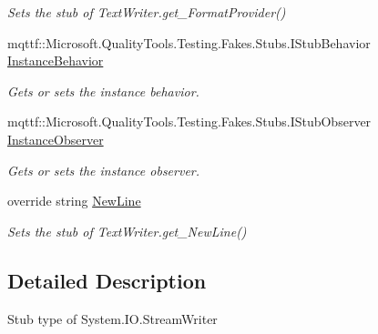 \begin{DoxyCompactItemize}
\begin{DoxyCompactList}\small\item\em Sets the stub of Text\-Writer.\-get\-\_\-\-Format\-Provider()\end{DoxyCompactList}\item 
mqttf\-::\-Microsoft.\-Quality\-Tools.\-Testing.\-Fakes.\-Stubs.\-I\-Stub\-Behavior \hyperlink{class_system_1_1_i_o_1_1_fakes_1_1_stub_stream_writer_ac75f270da6040b457ca503b589400b3b}{Instance\-Behavior}
\begin{DoxyCompactList}\small\item\em Gets or sets the instance behavior.\end{DoxyCompactList}\item 
mqttf\-::\-Microsoft.\-Quality\-Tools.\-Testing.\-Fakes.\-Stubs.\-I\-Stub\-Observer \hyperlink{class_system_1_1_i_o_1_1_fakes_1_1_stub_stream_writer_af6430fd0b73cae7068f939735fe67530}{Instance\-Observer}
\begin{DoxyCompactList}\small\item\em Gets or sets the instance observer.\end{DoxyCompactList}\item 
override string \hyperlink{class_system_1_1_i_o_1_1_fakes_1_1_stub_stream_writer_af8fbedb65b4d78881a6bfc6a8a29efb3}{New\-Line}
\begin{DoxyCompactList}\small\item\em Sets the stub of Text\-Writer.\-get\-\_\-\-New\-Line()\end{DoxyCompactList}\end{DoxyCompactItemize}


\subsection{Detailed Description}
Stub type of System.\-I\-O.\-Stream\-Writer



